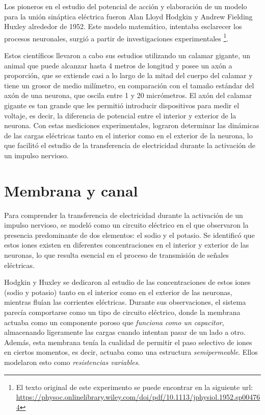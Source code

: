 Los pioneros en el estudio del potencial de acción y elaboración de un modelo para la unión sináptica eléctrica fueron Alan Lloyd Hodgkin y Andrew Fielding Huxley alrededor de 1952. Este modelo matemático, intentaba esclarecer los procesos neuronales, surgió a partir de investigaciones experimentales  \footnote{El texto original de este experimento se puede encontrar en la siguiente url: \url{ https://physoc.onlinelibrary.wiley.com/doi/pdf/10.1113/jphysiol.1952.sp004764}}.

Estos científicos llevaron a cabo sus estudios utilizando un calamar gigante, un animal que puede alcanzar hasta 4 metros de longitud y posee un axón a proporción, que se extiende casi a lo largo de la mitad del cuerpo del calamar y tiene un grosor de medio milímetro, en comparación con el tamaño estándar del axón de una neurona, que oscila entre 1 y 20 micrómetros. 
El axón del calamar gigante es tan grande que les permitió introducir dispositivos para medir el voltaje, es decir, la diferencia de potencial entre el interior y exterior de la neurona. Con estas mediciones experimentales, lograron determinar las dinámicas de las cargas eléctricas tanto en el interior como en el exterior de la neurona, lo que facilitó el estudio de la transferencia de electricidad durante la activación de un impulso nervioso.
 

\section{Membrana y canal}

Para comprender la transferencia de electricidad durante la activación de un impulso nervioso, se modeló como un circuito eléctrico en el que observaron la presencia predominante de dos elementos: el sodio y el potasio. Se identificó que estos iones existen en diferentes concentraciones en el interior y exterior de las neuronas, lo que resulta esencial en el proceso de transmisión de señales eléctricas.

Hodgkin y Huxley se dedicaron al estudio de las concentraciones de estos iones (sodio y potasio) tanto en el interior como en el exterior de las neuronas, mientras fluían las corrientes eléctricas. Durante sus observaciones, el sistema parecía comportarse como un tipo de circuito eléctrico, donde la membrana actuaba como un componente poroso que \textit{funciona como un capacitor}, almacenando ligeramente las cargas cuando intentan pasar de un lado a otro. Además, esta membrana tenía la cualidad de permitir el paso selectivo de iones en ciertos momentos, es decir, actuaba como una estructura \textit{semipermeable}. Ellos modelaron esto como \textit{resistencias variables}.

